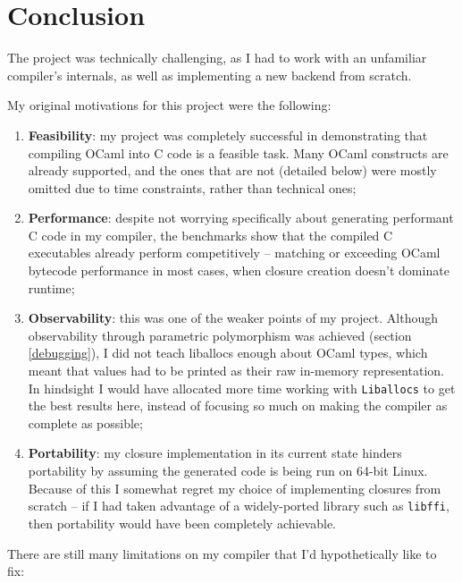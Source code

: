\documentclass[12pt,a4paper,twoside,openright]{report}
\begin{document}
\chapter{Conclusion}\label{conclusion}

The project was technically challenging, as I had to work with an unfamiliar
compiler's internals, as well as implementing a new backend from scratch.

My original motivations for this project were the following:
\begin{enumerate}
    \item \textbf{Feasibility}: my project was completely successful in
      demonstrating that compiling OCaml into C code is a feasible task. Many
      OCaml constructs are already supported, and the ones that are not
      (detailed below) were mostly omitted due to time constraints, rather than
      technical ones;
    \item \textbf{Performance}: despite not worrying specifically about
      generating performant C code in my compiler, the benchmarks show that
      the compiled C executables already perform competitively -- matching or
      exceeding OCaml bytecode performance in most cases, when closure creation
      doesn't dominate runtime;
    \item \textbf{Observability}: this was one of the weaker points of my
      project. Although observability through parametric polymorphism was
      achieved (section \ref{debugging}), I did not teach liballocs enough about OCaml
      types, which meant that values had to be printed as their raw in-memory representation.
      In hindsight I would have allocated more time working with
      \lstinline!Liballocs! to get the best results here, instead of focusing
      so much on making the compiler as complete as possible;
    \item \textbf{Portability}: my closure implementation in its current state
      hinders portability by assuming the generated code is being
      run on 64-bit Linux. Because of this
          I somewhat regret my choice of implementing closures from scratch --
          if I had taken advantage of a widely-ported library such as
          \lstinline!libffi!, then portability would have been completely
          achievable.
\end{enumerate}

There are still many limitations on my compiler that I'd
hypothetically like to fix:
\end{document}
